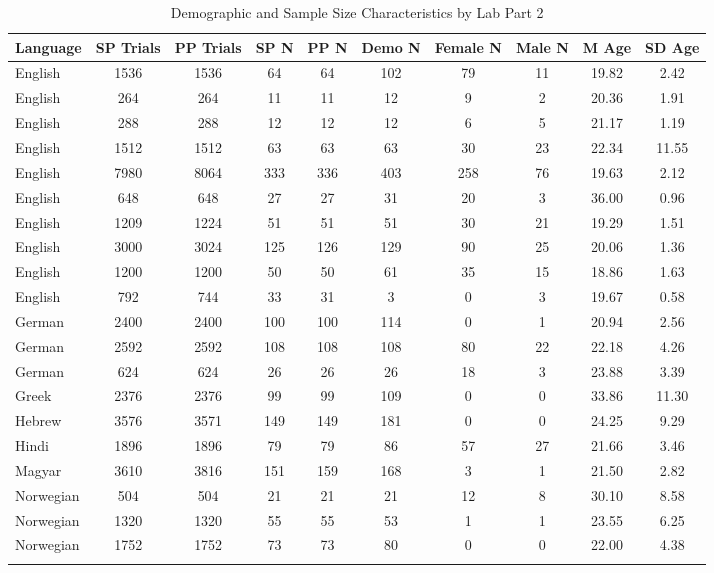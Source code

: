 \documentclass[
  man,floatsintext]{apa7}
\begin{document}
\begin{table}[tbp]

\begin{center}
\begin{threeparttable}

\caption{\label{tab:print-part2}Demographic and Sample Size Characteristics by Lab Part 2}

\footnotesize{

\begin{tabular}{lccccccccc}
\toprule
Language & SP 
Trials & PP 
Trials & SP 
N & PP 
N & Demo 
N & Female 
N & Male 
N & M 
Age & SD 
Age\\
\midrule
English & 1536 & 1536 & 64 & 64 & 102 & 79 & 11 & 19.82 & 2.42\\
English & 264 & 264 & 11 & 11 & 12 & 9 & 2 & 20.36 & 1.91\\
English & 288 & 288 & 12 & 12 & 12 & 6 & 5 & 21.17 & 1.19\\
English & 1512 & 1512 & 63 & 63 & 63 & 30 & 23 & 22.34 & 11.55\\
English & 7980 & 8064 & 333 & 336 & 403 & 258 & 76 & 19.63 & 2.12\\
English & 648 & 648 & 27 & 27 & 31 & 20 & 3 & 36.00 & 0.96\\
English & 1209 & 1224 & 51 & 51 & 51 & 30 & 21 & 19.29 & 1.51\\
English & 3000 & 3024 & 125 & 126 & 129 & 90 & 25 & 20.06 & 1.36\\
English & 1200 & 1200 & 50 & 50 & 61 & 35 & 15 & 18.86 & 1.63\\
English & 792 & 744 & 33 & 31 & 3 & 0 & 3 & 19.67 & 0.58\\
German & 2400 & 2400 & 100 & 100 & 114 & 0 & 1 & 20.94 & 2.56\\
German & 2592 & 2592 & 108 & 108 & 108 & 80 & 22 & 22.18 & 4.26\\
German & 624 & 624 & 26 & 26 & 26 & 18 & 3 & 23.88 & 3.39\\
Greek & 2376 & 2376 & 99 & 99 & 109 & 0 & 0 & 33.86 & 11.30\\
Hebrew & 3576 & 3571 & 149 & 149 & 181 & 0 & 0 & 24.25 & 9.29\\
Hindi & 1896 & 1896 & 79 & 79 & 86 & 57 & 27 & 21.66 & 3.46\\
Magyar & 3610 & 3816 & 151 & 159 & 168 & 3 & 1 & 21.50 & 2.82\\
Norwegian & 504 & 504 & 21 & 21 & 21 & 12 & 8 & 30.10 & 8.58\\
Norwegian & 1320 & 1320 & 55 & 55 & 53 & 1 & 1 & 23.55 & 6.25\\
Norwegian & 1752 & 1752 & 73 & 73 & 80 & 0 & 0 & 22.00 & 4.38\\
\bottomrule
\addlinespace
\end{tabular}

}
\end{threeparttable}
\end{center}
\end{table}
\end{document}
